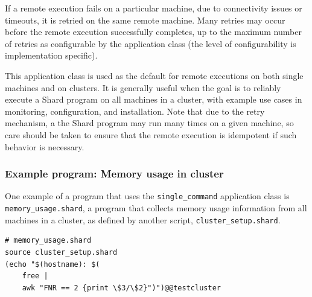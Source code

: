 \documentclass[twoside]{report}
\begin{document}
If a remote execution fails on a particular machine, due to connectivity issues or timeouts, it is retried on the same remote machine.
Many retries may occur before the remote execution successfully completes, up to the maximum number of retries as configurable by the application class (the level of configurability is implementation specific).

This application class is used as the default for remote executions on both single machines and on clusters.
It is generally useful when the goal is to reliably execute a Shard program on all machines in a cluster, with example use cases in monitoring, configuration, and installation.
Note that due to the retry mechanism, a the Shard program may run many times on a given machine, so care should be taken to ensure that the remote execution is idempotent if such behavior is necessary.

\subsubsection{Example program: Memory usage in cluster}

One example of a program that uses the \texttt{single\_command} application class is \texttt{memory\_usage.shard}, a program that collects memory usage information from all machines in a cluster, as defined by another script, \texttt{cluster\_setup.shard}.

\begin{minipage}[c]{\textwidth-15pt}
  \begin{lstlisting}[language=Shard]
# memory_usage.shard
source cluster_setup.shard
(echo "$(hostname): $(
    free |
    awk "FNR == 2 {print \$3/\$2}")")@@testcluster
\end{lstlisting}
  \smallskip
\end{minipage}
\end{document}
